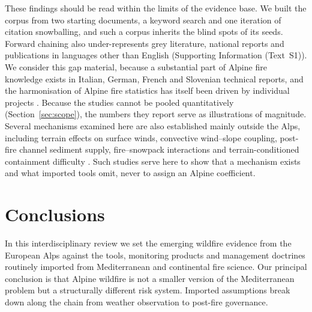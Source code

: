 \documentclass[11pt,a4paper]{article}
\begin{document}
\label{sec:limitations}
These findings should be read within the limits of the evidence base. We built the corpus from two starting documents, a keyword search and one iteration of citation snowballing, and such a corpus inherits the blind spots of its seeds. Forward chaining also under-represents grey literature, national reports and publications in languages other than English (Supporting Information (Text~S1)). We consider this gap material, because a substantial part of Alpine fire knowledge exists in Italian, German, French and Slovenian technical reports, and the harmonisation of Alpine fire statistics has itself been driven by individual projects \citep{valese_wildfires_2011}. Because the studies cannot be pooled quantitatively (Section~\ref{sec:scope}), the numbers they report serve as illustrations of magnitude. Several mechanisms examined here are also established mainly outside the Alps, including terrain effects on surface winds, convective wind--slope coupling, post-fire channel sediment supply, fire--snowpack interactions and terrain-conditioned containment difficulty \citep{sharples_overview_2009, hayajneh_wind_2026, morell_sediment_2021, koshkin_wildfire_2022, cardil_assessing_2025}. Such studies serve here to show that a mechanism exists and what imported tools omit, never to assign an Alpine coefficient.

\section{Conclusions}
\label{sec:conclusions}

In this interdisciplinary review we set the emerging wildfire evidence from the European Alps against the tools, monitoring products and management doctrines routinely imported from Mediterranean and continental fire science. Our principal conclusion is that Alpine wildfire is not a smaller version of the Mediterranean problem but a structurally different risk system. Imported assumptions break down along the chain from weather observation to post-fire governance.
\end{document}

